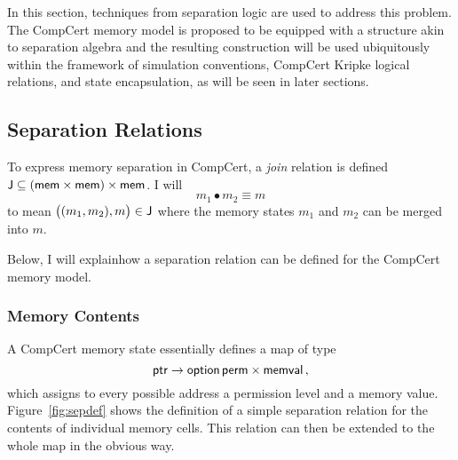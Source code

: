 In this section,
techniques from separation logic are used
to address this problem.
The CompCert memory model is proposed to be equipped
with a structure akin to separation algebra \citep{freshlook}
and the resulting construction will be used ubiquitously
within the framework of simulation conventions,
CompCert Kripke logical relations,
and state encapsulation, as will be seen in later sections.

\subsection{Separation Relations}

To express memory separation in CompCert,
a \emph{join} relation is defined
$ \mathsf{J}  \subseteq ( \mathsf{mem}  \times  \mathsf{mem} ) \times  \mathsf{mem} $.
I will
\[
  m_1 \bullet m_2 \equiv m
\]
to mean
$\bigl((m_1, m_2), m\bigr) \in  \mathsf{J} $
where
the memory states $m_1$ and $m_2$
can be merged into $m$.

Below, I will explainhow a separation relation can be defined
for the CompCert memory model.

\subsubsection{Memory Contents}

A CompCert memory state essentially defines a map of type
\[
   \mathsf{ptr}  \rightarrow  \mathsf{option} \, \mathsf{perm}  \times  \mathsf{memval}  \,,
\]
which assigns to every possible address
a permission level and a memory value.
Figure~\ref{fig:sepdef}
shows the definition of a simple separation relation
for the contents of individual memory cells.
This relation can then be extended to the whole map
in the obvious way.

